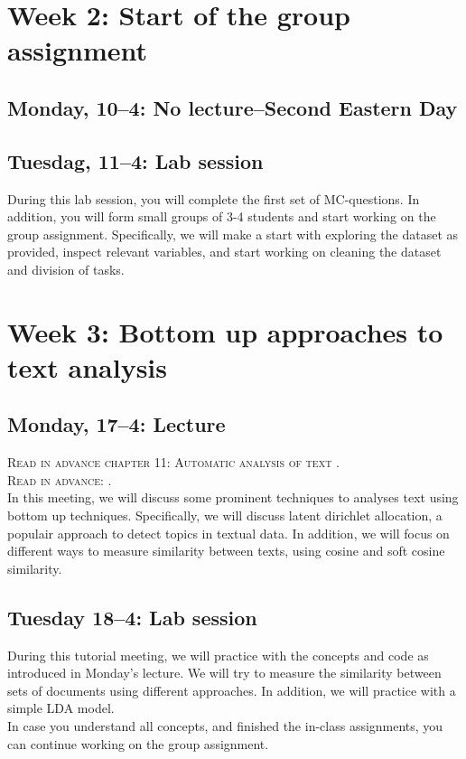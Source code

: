 \section*{Week 2: Start of the group assignment }

\subsection*{Monday, 10--4: No lecture--Second Eastern Day}

\subsection*{Tuesdag, 11--4: Lab session}
During this lab session, you will complete the first set of MC-questions. In addition, you will form small groups of 3-4 students and start working on the group assignment. Specifically, we will make a start with exploring the dataset as provided, inspect relevant variables, and start working on cleaning the dataset and division of tasks. 

\section*{Week 3: Bottom up approaches to text analysis}

\subsection*{Monday, 17--4: Lecture}
\textsc{Read in advance chapter 11: Automatic analysis of text \cite{van_atteveldt_computational_2022}.} \\
\textsc{Read in advance: \cite{Brinberg2021}.} \\

In this meeting, we will discuss some prominent techniques to analyses text using bottom up techniques. Specifically, we will discuss latent dirichlet allocation, a populair approach to detect topics in textual data. In addition, we will focus on different ways to measure similarity between texts, using cosine and soft cosine similarity. 

\subsection*{Tuesday 18--4: Lab session}
During this tutorial meeting, we will practice with the concepts and code as introduced in Monday's lecture. We will try to measure the similarity between sets of documents using different approaches. In addition, we will practice with a simple LDA model. \\
In case you understand all concepts, and finished the in-class assignments, you can continue working on the group assignment. 


